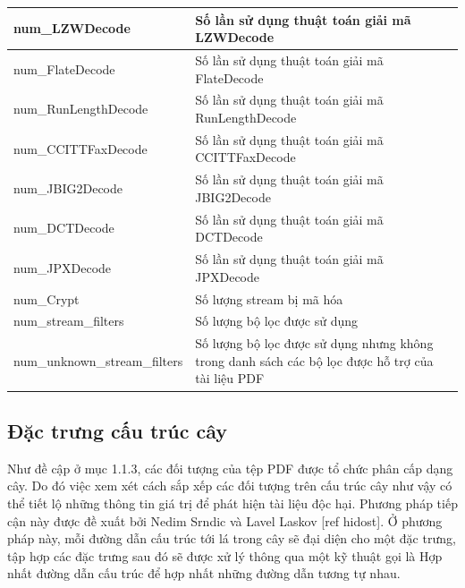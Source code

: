 \documentclass[./../main.tex]{subfiles}
\begin{document}
\begin{longtable}[c]{|p{}|p{}|}
	num\_LZWDecode                            & Số lần sử dụng thuật toán giải mã LZWDecode                                                                                 \\ \hline
	num\_FlateDecode                          & Số lần sử dụng thuật toán giải mã FlateDecode                                                                               \\ \hline
	num\_RunLengthDecode                      & Số lần sử dụng thuật toán giải mã RunLengthDecode                                                                           \\ \hline
	num\_CCITTFaxDecode                       & Số lần sử dụng thuật toán giải mã CCITTFaxDecode                                                                            \\ \hline
	num\_JBIG2Decode                          & Số lần sử dụng thuật toán giải mã JBIG2Decode                                                                               \\ \hline
	num\_DCTDecode                            & Số lần sử dụng thuật toán giải mã DCTDecode                                                                                 \\ \hline
	num\_JPXDecode                            & Số lần sử dụng thuật toán giải mã JPXDecode                                                                                 \\ \hline
	num\_Crypt                                & Số lượng stream bị mã hóa                                                                                                   \\ \hline
	num\_stream\_filters                      & Số lượng bộ lọc được sử dụng                                                                                                \\ \hline
	num\_unknown\_stream\_filters             & Số lượng bộ lọc được sử dụng nhưng không trong danh sách các bộ lọc được hỗ trợ của tài liệu PDF                            \\ \hline
\end{longtable}
\subsection{Đặc trưng cấu trúc cây}
Như đề cập ở mục 1.1.3, các đối tượng của tệp PDF được tổ chức phân cấp dạng cây. Do đó việc xem xét cách sắp xếp các đối tượng trên cấu trúc cây như vậy có thể tiết lộ những thông tin giá trị để phát hiện tài liệu độc hại. Phương pháp tiếp cận này được đề xuất bởi Nedim Srndic và Lavel Laskov [ref hidost]. Ở phương pháp này, mỗi đường dẫn cấu trúc tới lá trong cây sẽ đại diện cho một đặc trưng, tập hợp các đặc trưng sau đó sẽ được xử lý thông qua một kỹ thuật gọi là Hợp nhất đường dẫn cấu trúc để hợp nhất những đường dẫn tương tự nhau.
\end{document}
